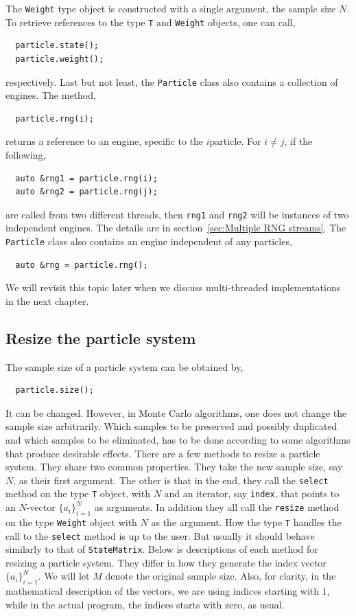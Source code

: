 The \verb|Weight| type object is constructed with a single argument, the sample
size $N$. To retrieve references to the type \verb|T| and \verb|Weight|
objects, one can call,
\begin{Verbatim}
  particle.state();
  particle.weight();
\end{Verbatim}
respectively. Last but not least, the \verb|Particle| class also contains a
collection of \rng engines. The method,
\begin{Verbatim}
  particle.rng(i);
\end{Verbatim}
returns a reference to an \rng engine, specific to the $i$\ith particle. For $i
\ne j$, if the following,
\begin{Verbatim}
  auto &rng1 = particle.rng(i);
  auto &rng2 = particle.rng(j);
\end{Verbatim}
are called from two different threads, then \verb|rng1| and \verb|rng2| will be
instances of two independent \rng engines. The details are in
section~\ref{sec:Multiple RNG streams}. The \verb|Particle| class also contains
an \rng engine independent of any particles,
\begin{Verbatim}
  auto &rng = particle.rng();
\end{Verbatim}
We will revisit this topic later when we discuss multi-threaded implementations
in the next chapter.

\subsection{Resize the particle system}
\label{sub:Resize the particle system}

The sample size of a particle system can be obtained by,
\begin{Verbatim}
  particle.size();
\end{Verbatim}
It can be changed. However, in Monte Carlo algorithms, one does not change the
sample size arbitrarily. Which samples to be preserved and possibly duplicated
and which samples to be eliminated, has to be done according to some algorithms
that produce desirable effects. There are a few methods to resize a particle
system. They share two common properties. They take the new sample size, say
$N$, as their first argument. The other is that in the end, they call the
\verb|select| method on the type \verb|T| object, with $N$ and an iterator, say
\verb|index|, that points to an $N$-vector $\{a_i\}_{i=1}^N$ as arguments. In
addition they all call the \verb|resize| method on the type \verb|Weight|
object with $N$ as the argument. How the type \verb|T| handles the call to the
\verb|select| method is up to the user. But usually it should behave similarly
to that of \verb|StateMatrix|. Below is descriptions of each method for
resizing a particle system. They differ in how they generate the index vector
$\{a_i\}_{i=1}^N$. We will let $M$ denote the original sample size. Also, for
clarity, in the mathematical description of the vectors, we are using indices
starting with $1$, while in the actual \cpp program, the indices starts with
zero, as usual.

